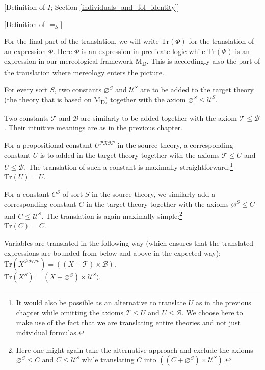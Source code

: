 \documentclass[12pt]{book}
\begin{document}
[Definition of $I$; Section \ref{individuals_and_fol_identity}]

[Definition of $=_S$]

For the final part of the translation, we will write $\mathrm{Tr}(\Phi)$ for the translation of an expression $\Phi$. Here $\Phi$ is an expression in predicate logic while $\mathrm{Tr}(\Phi)$ is an expression in our mereological framework M\textsubscript{D}. This is accordingly also the part of the translation where mereology enters the picture.

For every sort $S$, two constants $\varnothing^S$ and $\mathcal{U}^S$ are to be added to the target theory (the theory that is based on M\textsubscript{D}) together with the axiom $\varnothing^S \le \mathcal{U}^S$.

Two constants $\mathcal{T}$ and $\mathcal{B}$ are similarly to be added together with the axiom $\mathcal{T} \le \mathcal{B}$. Their intuitive meanings are as in the previous chapter.

For a propositional constant $U^{\mathcal{PROP}}$ in the source theory, a corresponding constant $U$ is to added in the target theory together with the axioms $\mathcal{T} \le U$ and $U \le \mathcal{B}$. The translation of such a constant is maximally straightforward:\footnote{It would also be possible as an alternative to translate $U$ as in the previous chapter while omitting the axioms $\mathcal{T} \le U$ and $U \le \mathcal{B}$. We choose here to make use of the fact that we are translating entire theories and not just individual formulas.}\\
\indent * $\mathrm{Tr}(U) = U$.

For a constant $C^S$ of sort $S$ in the source theory, we similarly add a corresponding constant $C$ in the target theory together with the axioms $\varnothing^S \le C$ and $C \le \mathcal{U}^S$. The translation is again maximally simple:\footnote{Here one might again take the alternative approach and exclude the axioms $\varnothing^S \le C$ and $C \le \mathcal{U}^S$ while translating $C$ into $((C + \varnothing^S) \times \mathcal{U}^S)$.}\\
\indent * $\mathrm{Tr}(C) = C$.

Variables are translated in the following way (which ensures that the translated expressions are bounded from below and above in the expected way):\\
\indent * $\mathrm{Tr}(X^{\mathcal{PROP}}) = ((X + \mathcal{T}) \times \mathcal{B})$.\\
\indent * $\mathrm{Tr}(X^S) = (X + \varnothing^S) \times \mathcal{U}^S)$.
\end{document}
